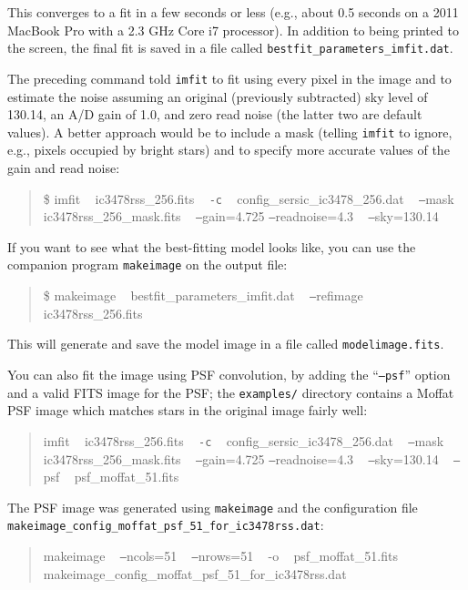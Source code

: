 \documentclass[10pt]{article}
\newcommand{\imfit}{\texttt{imfit}}
\newcommand{\makeimage}{\texttt{makeimage}}
\begin{document}
This converges to a fit in a few seconds or less (e.g., about 0.5 seconds on a 
2011 MacBook Pro with a 2.3 GHz Core i7 processor). In addition to being printed to
the screen, the final fit is saved in a file called \texttt{bestfit\_parameters\_imfit.dat}.

The preceding command told \imfit{} to fit using every pixel in the image and to estimate
the noise assuming an original (previously subtracted) sky level of 130.14, an A/D gain
of 1.0, and zero read noise (the latter two are default values). A better approach would be to include a mask (telling \imfit{}
to ignore, e.g., pixels occupied by bright stars) and to specify more accurate values
of the gain and read noise:
\begin{quote}
\$ imfit ~ ic3478rss\_256.fits ~ \texttt{-c} ~ config\_sersic\_ic3478\_256.dat ~ \texttt{--}mask ~ ic3478rss\_256\_mask.fits ~ \texttt{--}gain=4.725 \texttt{--}readnoise=4.3 ~ \texttt{--}sky=130.14
\end{quote}

If you want to see what the best-fitting model looks like, you can use the companion program \makeimage{}
on the output file:
\begin{quote}
\$ makeimage ~ bestfit\_parameters\_imfit.dat ~ \texttt{--}refimage ~ ic3478rss\_256.fits
\end{quote}
This will generate and save the model image in a file called \texttt{modelimage.fits}.


You can also fit the image using PSF convolution, by adding the ``\texttt{--psf}'' option and a
valid FITS image for the PSF; the \texttt{examples/} directory contains a Moffat PSF image which
matches stars in the original image fairly well:
\begin{quote}
imfit ~ ic3478rss\_256.fits ~ \texttt{-c} ~ config\_sersic\_ic3478\_256.dat ~ \texttt{--}mask ~ ic3478rss\_256\_mask.fits ~ \texttt{--}gain=4.725 \texttt{--}readnoise=4.3 ~ \texttt{--}sky=130.14 ~ \texttt{--}psf ~ psf\_moffat\_51.fits
\end{quote}


The PSF image was generated using \makeimage{} and the configuration
file \\
\texttt{makeimage\_config\_moffat\_psf\_51\_for\_ic3478rss.dat}:
\begin{quote}
makeimage ~ \texttt{--}ncols=51 ~ \texttt{--}nrows=51 ~ -o ~ psf\_moffat\_51.fits ~ makeimage\_config\_moffat\_psf\_51\_for\_ic3478rss.dat  
\end{quote}
\end{document}
